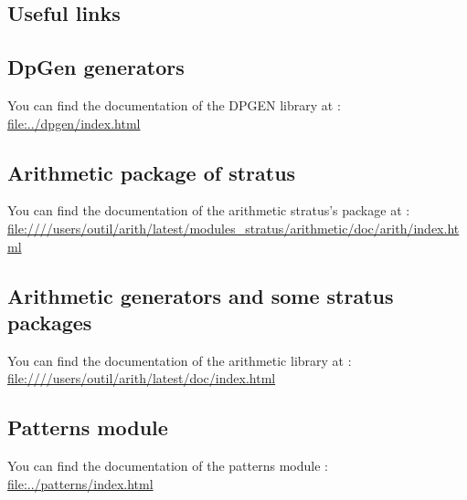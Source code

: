 \documentclass[11pt]{article}
\begin{document}
\begin{htmlonly}

\section{Useful links}

    \subsection{DpGen generators}
    
You can find the documentation of the DPGEN library at :\\
\url{file:../dpgen/index.html}

    \subsection{Arithmetic package of stratus}

You can find the documentation of the arithmetic stratus's package at :\\
\url{file:////users/outil/arith/latest/modules_stratus/arithmetic/doc/arith/index.html}

    \subsection{Arithmetic generators and some stratus packages}

You can find the documentation of the arithmetic library at :\\
\url{file:////users/outil/arith/latest/doc/index.html}

    \subsection{Patterns module}
    
You can find the documentation of the patterns module :\\
\url{file:../patterns/index.html}

\end{htmlonly}
\end{document}

